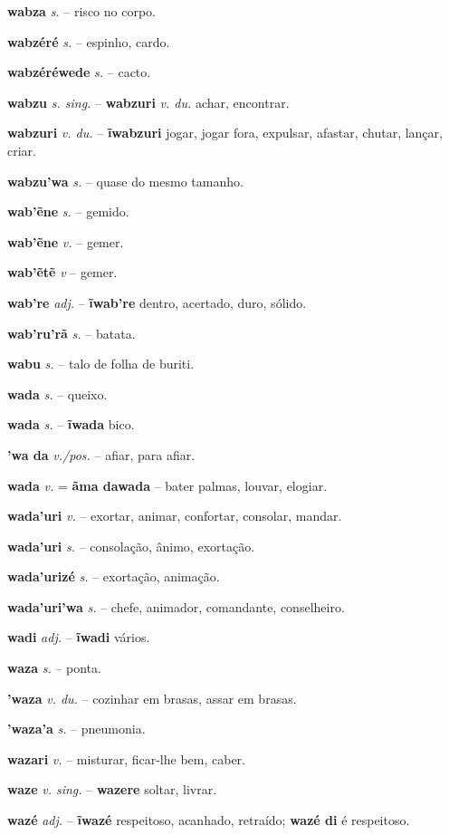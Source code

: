\textbf{wabza} \textit{s.} -- risco no corpo.

\textbf{wabzéré} \textit{s.} -- espinho, cardo.

\textbf{wabzéréwede} \textit{s.} -- cacto.

\textbf{wabzu} \textit{s. sing.} -- \textbf{wabzuri} \textit{v. du.} achar, encontrar.

\textbf{wabzuri} \textit{v. du.} -- \textbf{ĩwabzuri} jogar, jogar fora, expulsar, afastar, chutar, lançar, criar.

\textbf{wabzu'wa} \textit{s.} -- quase do mesmo tamanho.

\textbf{wab'ẽne} \textit{s.} -- gemido.

\textbf{wab'ẽne} \textit{v.} -- gemer.

\textbf{wab'ẽtẽ} \textit{v} -- gemer.

\textbf{wab're} \textit{adj.} -- \textbf{ĩwab're} dentro, acertado, duro, sólido.

\textbf{wab'ru'rã} \textit{s.} -- batata.

\textbf{wabu} \textit{s.} -- talo de folha de buriti.

\textbf{wada} \textit{s.} -- queixo.

\textbf{wada} \textit{s.} -- \textbf{ĩwada} bico.

\textbf{'wa da} \textit{v./pos.} -- afiar, para afiar.

\textbf{wada} \textit{v.} = \textbf{ãma dawada} -- bater palmas, louvar, elogiar.

\textbf{wada'uri} \textit{v.} -- exortar, animar, confortar, consolar, mandar.

\textbf{wada'uri} \textit{s.} -- consolação, ânimo, exortação.

\textbf{wada'urizé} \textit{s.} -- exortação, animação.

\textbf{wada'uri'wa} \textit{s.} -- chefe, animador, comandante, conselheiro.

\textbf{wadi} \textit{adj.} -- \textbf{ĩwadi} vários.

\textbf{waza} \textit{s.} -- ponta.

\textbf{'waza} \textit{v. du.} -- cozinhar em brasas, assar em brasas.

\textbf{'waza'a} \textit{s.} -- pneumonia.

\textbf{wazari} \textit{v.} -- misturar, ficar-lhe bem, caber.

\textbf{waze} \textit{v. sing.} -- \textbf{wazere} soltar, livrar.

\textbf{wazé} \textit{adj.} -- \textbf{ĩwazé} respeitoso, acanhado, retraído; \textbf{wazé di} é respeitoso.

